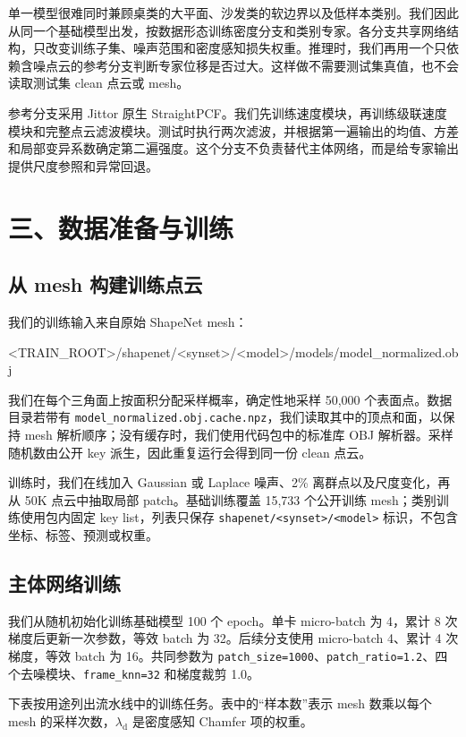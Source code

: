 \documentclass[UTF8,a4paper,11pt,fontset=fandol]{ctexart}
\newcommand{\code}[1]{\nolinkurl{#1}}
\begin{document}
单一模型很难同时兼顾桌类的大平面、沙发类的软边界以及低样本类别。我们因此从同一个基础模型出发，按数据形态训练密度分支和类别专家。各分支共享网络结构，只改变训练子集、噪声范围和密度感知损失权重。推理时，我们再用一个只依赖含噪点云的参考分支判断专家位移是否过大。这样做不需要测试集真值，也不会读取测试集 clean 点云或 mesh。

参考分支采用 Jittor 原生 StraightPCF。我们先训练速度模块，再训练级联速度模块和完整点云滤波模块。测试时执行两次滤波，并根据第一遍输出的均值、方差和局部变异系数确定第二遍强度。这个分支不负责替代主体网络，而是给专家输出提供尺度参照和异常回退。

\newpage
\section{三、数据准备与训练}

\subsection{从 mesh 构建训练点云}

我们的训练输入来自原始 ShapeNet mesh：

\begin{CodeBlock}
<TRAIN_ROOT>/shapenet/<synset>/<model>/models/model_normalized.obj
\end{CodeBlock}

我们在每个三角面上按面积分配采样概率，确定性地采样 50,000 个表面点。数据目录若带有 \code{model_normalized.obj.cache.npz}，我们读取其中的顶点和面，以保持 mesh 解析顺序；没有缓存时，我们使用代码包中的标准库 OBJ 解析器。采样随机数由公开 key 派生，因此重复运行会得到同一份 clean 点云。

训练时，我们在线加入 Gaussian 或 Laplace 噪声、2\% 离群点以及尺度变化，再从 50K 点云中抽取局部 patch。基础训练覆盖 15,733 个公开训练 mesh；类别训练使用包内固定 key list，列表只保存 \code{shapenet/<synset>/<model>} 标识，不包含坐标、标签、预测或权重。

\subsection{主体网络训练}

我们从随机初始化训练基础模型 100 个 epoch。单卡 micro-batch 为 4，累计 8 次梯度后更新一次参数，等效 batch 为 32。后续分支使用 micro-batch 4、累计 4 次梯度，等效 batch 为 16。共同参数为 \code{patch_size=1000}、\code{patch_ratio=1.2}、四个去噪模块、\code{frame_knn=32} 和梯度裁剪 1.0。

下表按用途列出流水线中的训练任务。表中的“样本数”表示 mesh 数乘以每个 mesh 的采样次数，$\lambda_{\mathrm d}$ 是密度感知 Chamfer 项的权重。
\end{document}
